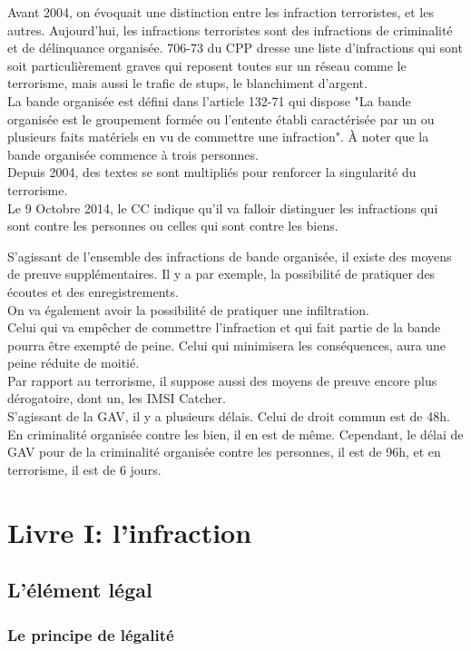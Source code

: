 \documentclass[10pt, a4paper, openany]{book}
\begin{document}
Avant 2004, on évoquait une distinction entre les infraction terroristes, et les autres. Aujourd'hui, les infractions terroristes sont des infractions de criminalité et de délinquance organisée. 706-73 du CPP dresse une liste d'infractions qui sont soit particulièrement graves qui reposent toutes sur un réseau comme le terrorisme, mais aussi le trafic de stups, le blanchiment d'argent. \\
La bande organisée est défini dans l'article 132-71 qui dispose "La bande organisée est le groupement formée ou l'entente établi caractérisée par un ou plusieurs faits matériels en vu de commettre une infraction". À noter que la bande organisée commence à trois personnes. \\
Depuis 2004, des textes se sont multipliés pour renforcer la singularité du terrorisme. \\
Le 9 Octobre 2014, le CC indique qu'il va falloir distinguer les infractions qui sont contre les personnes ou celles qui sont contre les biens. 


S'agissant de l'ensemble des infractions de bande organisée, il existe des moyens de preuve supplémentaires. Il y a par exemple, la possibilité de pratiquer des écoutes et des enregistrements. \\
On va également avoir la possibilité de pratiquer une infiltration. \\
Celui qui va empêcher de commettre l'infraction et qui fait partie de la bande pourra être exempté de peine. Celui qui minimisera les conséquences, aura une peine réduite de moitié. \\
Par rapport au terrorisme, il suppose aussi des moyens de preuve encore plus dérogatoire, dont un, les IMSI Catcher. \\
S'agissant de la GAV, il y a plusieurs délais. Celui de droit commun est de 48h. En criminalité organisée contre les bien, il en est de même. Cependant, le délai de GAV pour de la criminalité organisée contre les personnes, il est de 96h, et en terrorisme, il est de 6 jours. 

\part{Livre I: l'infraction}

\chapter{L'élément légal}

\section{Le principe de légalité}
\end{document}
